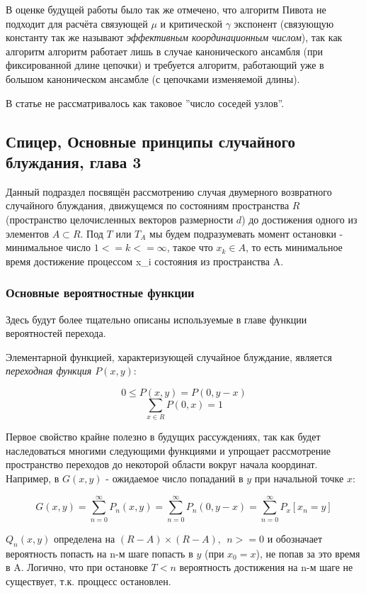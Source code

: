 В оценке будущей работы было так же отмечено, что алгоритм Пивота не подходит для расчёта связующей $\mu$ и критической $\gamma$ экспонент (связующую константу так же называют \textit{эффективным координационным числом}), так как алгоритм алгоритм работает лишь в случае канонического ансамбля (при фиксированной длине цепочки) и требуется алгоритм, работающий уже в большом каноническом ансамбле (с цепочками изменяемой длины).

В статье не рассматривалось как таковое ''число соседей узлов''.


\subsection{Спицер, Основные принципы случайного блуждания, глава 3}

Данный подраздел посвящён рассмотрению случая двумерного возвратного случайного блуждания, движущемся по состояниям пространства $R$ (пространство целочисленных векторов размерности $d$) до достижения одного из элементов $A \subset R$. Под $T$ или $T_A$ мы будем подразумевать момент остановки - минимальное число $1<= k <= \infty$, такое что $x_k \in A$, то есть минимальное время достижение процессом {x_i} состояния из пространства A.

\subsubsection{Основные вероятностные функции}

Здесь будут более тщательно описаны используемые в главе функции вероятностей перехода.

Элементарной функцией, характеризующей случайное блуждание, является \textit{переходная функция $P(x,y)$}:

\[ 0 \leq P(x,y) = P(0, y-x) \]
\[ \sum_{x \in R} P(0,x) = 1 \]

Первое свойство крайне полезно в будущих рассуждениях, так как будет наследоваться многими следующими функциями и упрощает рассмотрение пространство
переходов до некоторой области вокруг начала координат. Например, в $G(x,y)$ - ожидаемое число попаданий в $y$ при начальной точке $x$:

\begin{equation}
G(x,y) = \sum_{n=0}^{\infty} P_n(x,y) = \sum_{n=0}^{\infty} P_n(0, y - x) = \sum_{n=0}^{\infty} P_x[x_n=y]
\end{equation}

$Q_n(x,y)$ определена на $(R-A) \times (R-A),\ \ n >= 0$ и обозначает вероятность попасть на n-м шаге попасть в $y$ (при $x_0 = x$), не попав за это время в A. Логично, что при остановке $T<n$ вероятность достижения на n-м шаге не существует, т.к. проццесс остановлен.

